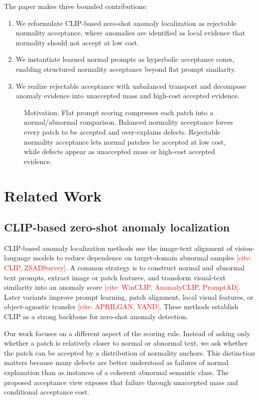 \documentclass[10pt]{article}
\newcommand{\needcite}[1]{\textcolor{red}{[cite: #1]}}
\newcommand{\figtodo}[1]{\textcolor{red}{[FIGURE TODO: #1]}}
\newcommand{\placeholderfigure}[2]{
\begin{figure}[t]
    \centering
    \fbox{
    \begin{minipage}[c][0.18\textheight][c]{0.92\linewidth}
        \centering
        \figtodo{#1}
    \end{minipage}}
    \caption{#2}
    \label{fig:#1}
\end{figure}
}
\begin{document}
The paper makes three bounded contributions:
\begin{enumerate}[leftmargin=*]
    \item We reformulate CLIP-based zero-shot anomaly localization as rejectable normality acceptance, where anomalies are identified as local evidence that normality should not accept at low cost.
    \item We instantiate learned normal prompts as hyperbolic acceptance cones, enabling structured normality acceptance beyond flat prompt similarity.
    \item We realize rejectable acceptance with unbalanced transport and decompose anomaly evidence into unaccepted mass and high-cost accepted evidence.
\end{enumerate}

\placeholderfigure{motivation}{Motivation. Flat prompt scoring compresses each patch into a normal/abnormal comparison. Balanced normality acceptance forces every patch to be accepted and over-explains defects. Rejectable normality acceptance lets normal patches be accepted at low cost, while defects appear as unaccepted mass or high-cost accepted evidence.}

\section{Related Work}

\subsection{CLIP-based zero-shot anomaly localization}

CLIP-based anomaly localization methods use the image-text alignment of vision-language models to reduce dependence on target-domain abnormal samples \needcite{CLIP, ZSADSurvey}.
A common strategy is to construct normal and abnormal text prompts, extract image or patch features, and transform visual-text similarity into an anomaly score \needcite{WinCLIP, AnomalyCLIP, PromptAD}.
Later variants improve prompt learning, patch alignment, local visual features, or object-agnostic transfer \needcite{APRILGAN, VAND}.
These methods establish CLIP as a strong backbone for zero-shot anomaly detection.

Our work focuses on a different aspect of the scoring rule.
Instead of asking only whether a patch is relatively closer to normal or abnormal text, we ask whether the patch can be accepted by a distribution of normality anchors.
This distinction matters because many defects are better understood as failures of normal explanation than as instances of a coherent abnormal semantic class.
The proposed acceptance view exposes that failure through unaccepted mass and conditional acceptance cost.
\end{document}
